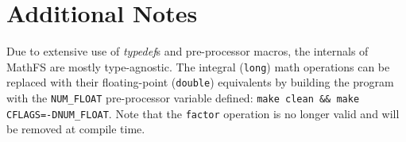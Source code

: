 \documentclass[10pt]{article}
\begin{document}
\section{Additional Notes}
Due to extensive use of \textit{typedef}s and pre-processor macros, the
internals of MathFS are mostly type-agnostic. The integral (\texttt{long})
math operations can be replaced with their floating-point
(\texttt{double}) equivalents by building the program with the
\texttt{NUM\_FLOAT} pre-processor variable defined: \texttt{make clean
\&\& make CFLAGS=-DNUM\_FLOAT}. Note that the \texttt{factor} operation is
no longer valid and will be removed at compile time.
\end{document}
